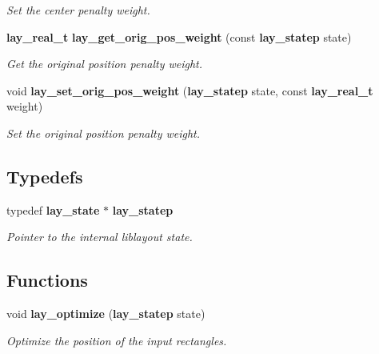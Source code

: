 \begin{CompactItemize}
\begin{CompactList}\small\item\em Set the center penalty weight. \item\end{CompactList}\item 
{\bf lay\_\-real\_\-t} {\bf lay\_\-get\_\-orig\_\-pos\_\-weight} (const  {\bf lay\_\-statep} state)\label{layout_8h_a11}

\begin{CompactList}\small\item\em Get the original position penalty weight. \item\end{CompactList}\item 
void {\bf lay\_\-set\_\-orig\_\-pos\_\-weight} ({\bf lay\_\-statep} state, const  {\bf lay\_\-real\_\-t} weight)\label{layout_8h_a12}

\begin{CompactList}\small\item\em Set the original position penalty weight. \item\end{CompactList}\end{CompactItemize}
\subsection*{Typedefs}
\begin{CompactItemize}
\item 
typedef {\bf lay\_\-state} $\ast$ {\bf lay\_\-statep}\label{layout_8h_a0}

\begin{CompactList}\small\item\em Pointer to the internal liblayout state. \item\end{CompactList}\end{CompactItemize}
\subsection*{Functions}
\begin{CompactItemize}
\item 
void {\bf lay\_\-optimize} ({\bf lay\_\-statep} state)
\begin{CompactList}\small\item\em Optimize the position of the input rectangles. \item\end{CompactList}\end{CompactItemize}


